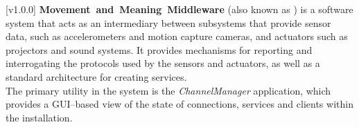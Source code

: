 [v1.0.0]
\textbf{Movement~and~Meaning~Middleware} (also known as \mplusm{}) is a software system
that acts as an intermediary between subsystems that provide sensor data, such as
accelerometers and motion capture cameras, and actuators such as projectors and sound
systems.
It provides mechanisms for reporting and interrogating the protocols used by the sensors
and actuators, as well as a standard architecture for creating services.\\

The primary utility in the \mplusm{} system is the \emph{ChannelManager}  application,
which provides a GUI--based view of the state of connections, services and clients within
the installation.
\primaryEnd{}
